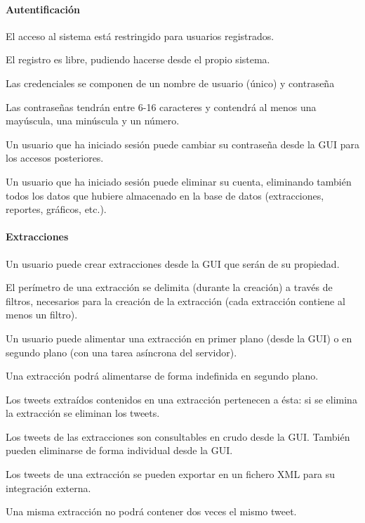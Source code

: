 


\begin{functional}

\paragraph{Autentificación}
        \item El acceso al sistema está restringido para usuarios registrados.
        \begin{functional}
                \item El registro es libre, pudiendo hacerse desde el propio sistema.
                \item Las credenciales se componen de un nombre de usuario (único) y contraseña
        \end{functional}
        \item Las contraseñas tendrán entre 6-16 caracteres y contendrá al menos una mayúscula, una minúscula y un número.
        \item Un usuario que ha iniciado sesión puede cambiar su contraseña desde la GUI para los accesos posteriores.
        \item Un usuario que ha iniciado sesión puede eliminar su cuenta, eliminando también todos los datos que hubiere almacenado en la base de datos (extracciones, reportes, gráficos, etc.).

\paragraph{Extracciones}

	\item Un usuario puede crear extracciones desde la GUI que serán de su propiedad.
	\item El perímetro de una extracción se delimita (durante la creación) a través de filtros, necesarios para la creación de la extracción (cada extracción contiene al menos un filtro).
	\item  Un usuario puede alimentar una extracción en primer plano (desde la GUI) o en segundo plano (con una tarea asíncrona del servidor).
	\item Una extracción podrá alimentarse de forma indefinida en segundo plano.
	\item Los tweets extraídos contenidos en una extracción pertenecen a ésta: si se elimina la extracción se eliminan los tweets.
	\item Los tweets de las extracciones son consultables en crudo desde la GUI. También pueden eliminarse de forma individual desde la GUI.
	\item Los tweets de una extracción se pueden exportar en un fichero XML para su integración externa.
	\item Una misma extracción no podrá contener dos veces el mismo tweet.
	

\end{functional}
